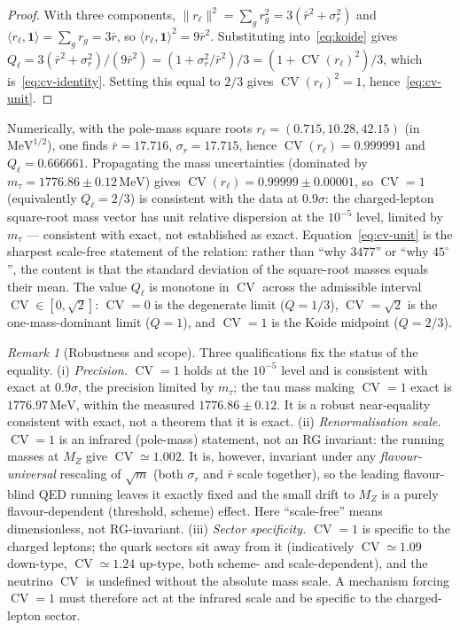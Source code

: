 \documentclass[11pt]{article}
\theoremstyle{definition}
\theoremstyle{remark}
\newtheorem{remark}{Remark}
\newcommand{\CV}{\operatorname{CV}}
\newcommand{\rl}{r_{\ell}}
\begin{document}
    \begin{proof}
      With three components, $\lVert \rl \rVert^2 = \sum_g r_g^2 = 3(\bar r^2 + \sigma_r^2)$ and
      $\langle \rl, \mathbf 1 \rangle = \sum_g r_g = 3 \bar r$, so $\langle \rl, \mathbf 1 \rangle^2 = 9 \bar r^2$.
      Substituting into~\eqref{eq:koide} gives
      $Q_\ell = 3(\bar r^2 + \sigma_r^2)/(9 \bar r^2) = (1 + \sigma_r^2/\bar r^2)/3 = (1 + \CV(\rl)^2)/3$, which
      is~\eqref{eq:cv-identity}.
      Setting this equal to $2/3$ gives $\CV(\rl)^2 = 1$, hence~\eqref{eq:cv-unit}.
    \end{proof}

    Numerically, with the pole-mass square roots $\rl = (0.715, 10.28, 42.15)$ (in $\mathrm{MeV}^{1/2}$), one finds
    $\bar r = 17.716$, $\sigma_r = 17.715$, hence $\CV(\rl) = 0.999991$ and $Q_\ell = 0.666661$.
    Propagating the mass uncertainties (dominated by $m_\tau = 1776.86 \pm 0.12\,\mathrm{MeV}$) gives
    $\CV(\rl) = 0.99999 \pm 0.00001$, so $\CV = 1$ (equivalently $Q_\ell = 2/3$) is consistent with the data at
    $0.9\sigma$: the charged-lepton square-root mass vector has unit relative dispersion at the $10^{-5}$ level,
    limited by $m_\tau$ --- consistent with exact, not established as exact.
    Equation~\eqref{eq:cv-unit} is the sharpest scale-free statement of the relation: rather than ``why $3477$'' or
    ``why $45^\circ$'', the content is that the standard deviation of the square-root masses equals their mean.
    The value $Q_\ell$ is monotone in $\CV$ across the admissible interval $\CV \in [0, \sqrt2]$: $\CV = 0$ is the
    degenerate limit ($Q = 1/3$), $\CV = \sqrt2$ is the one-mass-dominant limit ($Q = 1$), and $\CV = 1$ is the
    Koide midpoint ($Q = 2/3$).

    \begin{remark}[Robustness and scope]
      \label{rem:robustness}
      Three qualifications fix the status of the equality.
      (i) \emph{Precision.} $\CV = 1$ holds at the $10^{-5}$ level and is consistent with exact at $0.9\sigma$, the
      precision limited by $m_\tau$; the tau mass making $\CV = 1$ exact is $1776.97\,\mathrm{MeV}$, within the
      measured $1776.86 \pm 0.12$.
      It is a robust near-equality consistent with exact, not a theorem that it is exact.
      (ii) \emph{Renormalisation scale.} $\CV = 1$ is an infrared (pole-mass) statement, not an RG invariant: the
      running masses at $M_Z$ give $\CV \simeq 1.002$.
      It is, however, invariant under any \emph{flavour-universal} rescaling of $\sqrt m$ (both $\sigma_r$ and
      $\bar r$ scale together), so the leading flavour-blind QED running leaves it exactly fixed and the small
      drift to $M_Z$ is a purely flavour-dependent (threshold, scheme) effect.
      Here ``scale-free'' means dimensionless, not RG-invariant.
      (iii) \emph{Sector specificity.} $\CV = 1$ is specific to the charged leptons; the quark sectors sit away
      from it (indicatively $\CV \simeq 1.09$ down-type, $\CV \simeq 1.24$ up-type, both scheme- and
      scale-dependent), and the neutrino $\CV$ is undefined without the absolute mass scale.
      A mechanism forcing $\CV = 1$ must therefore act at the infrared scale and be specific to the charged-lepton
      sector.
    \end{remark}
\end{document}
